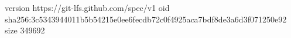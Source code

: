 version https://git-lfs.github.com/spec/v1
oid sha256:3c5343944011b5b54215e0ee6fecdb72c0f4925aca7bdf8de3a6d3f071250e92
size 349692

